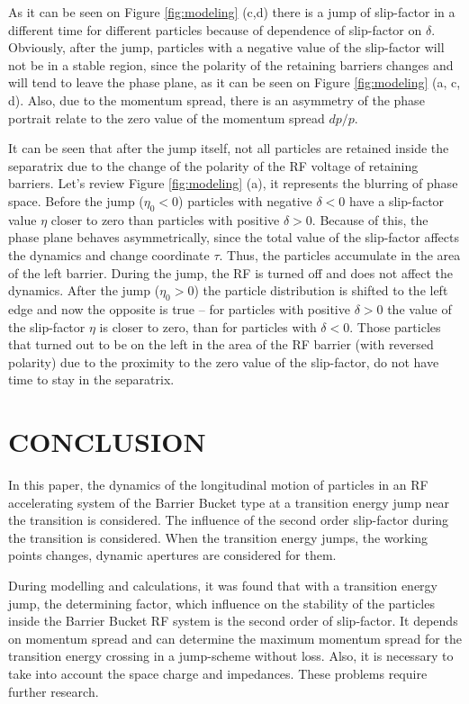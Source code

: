 \documentclass[a4paper,
               keeplastbox,   %
               ]{jacow}
\begin{document}
\par As it can be seen on Figure \ref{fig:modeling} (c,d) there is a jump of slip-factor in a different time for different particles because of dependence of slip-factor on $\delta$. Obviously, after the jump, particles with a negative value of the slip-factor will not be in a stable region, since the polarity of the retaining barriers changes and will tend to leave the phase plane, as it can be seen on Figure \ref{fig:modeling} (a, c, d). Also, due to the momentum spread, there is an asymmetry of the phase portrait relate to the zero value of the momentum spread $dp/p$.

\par It can be seen that after the jump itself, not all particles are retained inside the separatrix due to the change of the polarity of the RF voltage of retaining barriers. Let’s review Figure \ref{fig:modeling} (a), it represents the blurring of phase space. Before the jump ($\eta_{0}<0$) particles with negative $\delta<0$ have a slip-factor value $\eta$ closer to zero than particles with positive $\delta>0$. Because of this, the phase plane behaves asymmetrically, since the total value of the slip-factor affects the dynamics and change coordinate $\tau$. Thus, the particles accumulate in the area of the left barrier. During the jump, the RF is turned off and does not affect the dynamics. After the jump ($\eta_{0}>0$) the particle distribution is shifted to the left edge and now the opposite is true – for particles with positive $\delta>0$ the value of the slip-factor $\eta$ is closer to zero, than for particles with $\delta<0$. Those particles that turned out to be on the left in the area of the RF barrier (with reversed polarity) due to the proximity to the zero value of the slip-factor, do not have time to stay in the separatrix.

\section{CONCLUSION}

\par In this paper, the dynamics of the longitudinal motion of particles in an RF accelerating system of the Barrier Bucket type at a transition energy jump near the transition is considered. The influence of the second order slip-factor during the transition is considered. When the transition energy jumps, the working points changes, dynamic apertures are considered for them.
\par During modelling and calculations, it was found that with a transition energy jump, the determining factor, which influence on the stability of the particles inside the Barrier Bucket RF system is the second order of slip-factor. It depends on momentum spread and can determine the maximum momentum spread for the transition energy crossing in a jump-scheme without loss. Also, it is necessary to take into account the space charge and impedances. These problems require further research.
\end{document}
